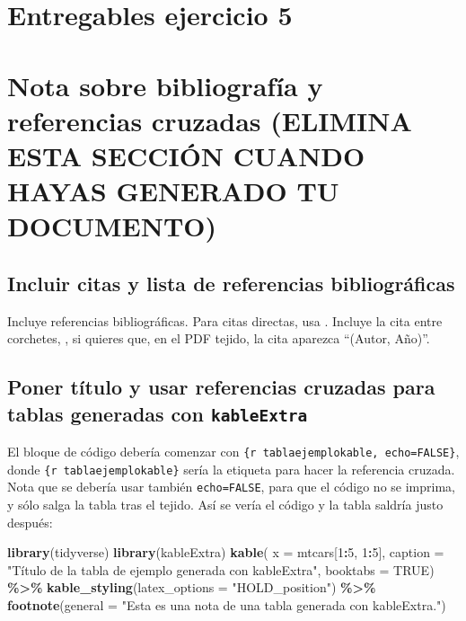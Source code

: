 \documentclass[spanish]{article}
\newenvironment{Shaded}{\begin{snugshade}}{\end{snugshade}}
\newcommand{\AttributeTok}[1]{\textcolor[rgb]{0.13,0.29,0.53}{#1}}
\newcommand{\ConstantTok}[1]{\textcolor[rgb]{0.56,0.35,0.01}{#1}}
\newcommand{\DecValTok}[1]{\textcolor[rgb]{0.00,0.00,0.81}{#1}}
\newcommand{\FunctionTok}[1]{\textcolor[rgb]{0.13,0.29,0.53}{\textbf{#1}}}
\newcommand{\NormalTok}[1]{#1}
\newcommand{\SpecialCharTok}[1]{\textcolor[rgb]{0.81,0.36,0.00}{\textbf{#1}}}
\newcommand{\StringTok}[1]{\textcolor[rgb]{0.31,0.60,0.02}{#1}}
\begin{document}
\section{Entregables ejercicio 5}\label{entregables-ejercicio-5}

\section{Nota sobre bibliografía y referencias cruzadas (ELIMINA ESTA
SECCIÓN CUANDO HAYAS GENERADO TU
DOCUMENTO)}\label{nota-sobre-bibliografuxeda-y-referencias-cruzadas-elimina-esta-secciuxf3n-cuando-hayas-generado-tu-documento}

\subsection{Incluir citas y lista de referencias
bibliográficas}\label{incluir-citas-y-lista-de-referencias-bibliogruxe1ficas}

Incluye referencias bibliográficas. Para citas directas, usa
\textcite{ETIQUETA_BIBTEX}. Incluye la cita entre corchetes,
\autocite{ETIQUETA_BIBTEX}, si quieres que, en el PDF tejido, la cita
aparezca ``(Autor, Año)''.

\subsection{\texorpdfstring{Poner título y usar referencias cruzadas
para tablas generadas con
\texttt{kableExtra}}{Poner título y usar referencias cruzadas para tablas generadas con kableExtra}}\label{poner-tuxedtulo-y-usar-referencias-cruzadas-para-tablas-generadas-con-kableextra}

El bloque de código debería comenzar con
\texttt{\{r\ tablaejemplokable,\ echo=FALSE\}}, donde
\texttt{\{r\ tablaejemplokable\}} sería la etiqueta para hacer la
referencia cruzada. Nota que se debería usar también
\texttt{echo=FALSE}, para que el código no se imprima, y sólo salga la
tabla tras el tejido. Así se vería el código y la tabla saldría justo
después:

\begin{Shaded}
\begin{Highlighting}[]
\FunctionTok{library}\NormalTok{(tidyverse)}
\FunctionTok{library}\NormalTok{(kableExtra)}
\FunctionTok{kable}\NormalTok{(}
  \AttributeTok{x =}\NormalTok{ mtcars[}\DecValTok{1}\SpecialCharTok{:}\DecValTok{5}\NormalTok{, }\DecValTok{1}\SpecialCharTok{:}\DecValTok{5}\NormalTok{],}
  \AttributeTok{caption =} \StringTok{"Título de la tabla de ejemplo generada con kableExtra"}\NormalTok{,}
  \AttributeTok{booktabs =} \ConstantTok{TRUE}\NormalTok{) }\SpecialCharTok{\%\textgreater{}\%}
  \FunctionTok{kable\_styling}\NormalTok{(}\AttributeTok{latex\_options =} \StringTok{"HOLD\_position"}\NormalTok{) }\SpecialCharTok{\%\textgreater{}\%}
  \FunctionTok{footnote}\NormalTok{(}\AttributeTok{general =} \StringTok{"Esta es una nota de una tabla generada con kableExtra."}\NormalTok{)}
\end{Highlighting}
\end{Shaded}
\end{document}
